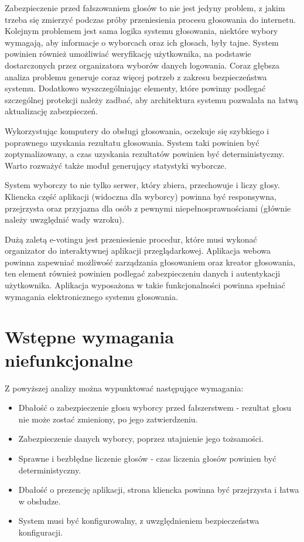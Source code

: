 \documentclass{report}
\begin{document}
Zabezpieczenie przed fałszowaniem głosów to nie jest jedyny problem, z jakim trzeba się zmierzyć podczas próby przeniesienia procesu głosowania do internetu. Kolejnym problemem jest sama logika systemu głosowania, niektóre wybory wymagają, aby informacje o wyborcach oraz ich głosach, były tajne. System powinien również umożliwiać weryfikację użytkownika, na podstawie dostarczonych przez organizatora wyborów danych logowania. Coraz głębsza analiza problemu generuje coraz więcej potrzeb z zakresu bezpieczeństwa systemu. Dodatkowo wyszczególniając elementy, które powinny podlegać szczególnej protekcji należy zadbać, aby architektura systemu pozwalała na łatwą aktualizację zabezpieczeń.

Wykorzystując komputery do obsługi głosowania, oczekuje się szybkiego i poprawnego uzyskania rezultatu głosowania. System taki powinien być zoptymalizowany, a czas uzyskania rezultatów powinien być deterministyczny. Warto rozważyć także moduł generujący statystyki wyborcze.

System wyborczy to nie tylko serwer, który zbiera, przechowuje i liczy głosy. Kliencka część aplikacji (widoczna dla wyborcy) powinna być responsywna, przejrzysta oraz przyjazna dla osób z pewnymi niepełnosprawnościami (głównie należy uwzględnić wady wzroku).

Dużą zaletą e-votingu jest przeniesienie procedur, które musi wykonać organizator do interaktywnej aplikacji przeglądarkowej. Aplikacja webowa powinna zapewniać możliwość zarządzania głosowaniem oraz kreator głosowania, ten element również powinien podlegać zabezpieczeniu danych i autentykacji użytkownika. Aplikacja wyposażona w takie funkcjonalności powinna spełniać wymagania elektronicznego systemu głosowania.

\section{Wstępne wymagania niefunkcjonalne}
Z powyższej analizy można wypunktować następujące wymagania:
\begin{itemize}

\item Dbałość o zabezpieczenie głosu wyborcy przed fałszerstwem - rezultat głosu nie może zostać zmieniony, po jego zatwierdzeniu.

\item Zabezpieczenie danych wyborcy, poprzez utajnienie jego tożsamości.

\item Sprawne i bezbłędne liczenie głosów - czas liczenia głosów powinien być deterministyczny.

\item Dbałość o prezencję aplikacji, strona kliencka powinna być przejrzysta i łatwa w obsłudze.

\item System musi być konfigurowalny, z uwzględnieniem bezpieczeństwa konfiguracji.
\end{itemize}
\end{document}
